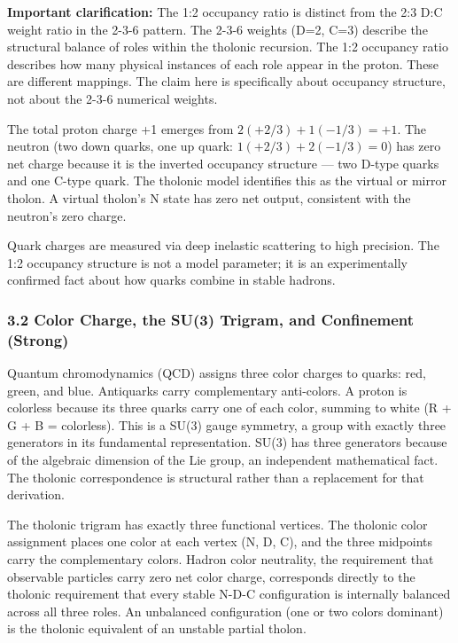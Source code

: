\documentclass[
  11pt,
  letterpaper,
]{article}
\begin{document}
\textbf{Important clarification:} The 1:2 occupancy ratio is distinct
from the 2:3 D:C weight ratio in the 2-3-6 pattern. The 2-3-6 weights
(D=2, C=3) describe the structural balance of roles within the tholonic
recursion. The 1:2 occupancy ratio describes how many physical instances
of each role appear in the proton. These are different mappings. The
claim here is specifically about occupancy structure, not about the
2-3-6 numerical weights.

The total proton charge +1 emerges from \(2(+2/3) + 1(-1/3) = +1\). The
neutron (two down quarks, one up quark: \(1(+2/3) + 2(-1/3) = 0\)) has
zero net charge because it is the inverted occupancy structure --- two
D-type quarks and one C-type quark. The tholonic model identifies this
as the virtual or mirror tholon. A virtual tholon's N state has zero net
output, consistent with the neutron's zero charge.

Quark charges are measured via deep inelastic scattering to high
precision. The 1:2 occupancy structure is not a model parameter; it is
an experimentally confirmed fact about how quarks combine in stable
hadrons.

\subsubsection{3.2 Color Charge, the SU(3) Trigram, and Confinement
(Strong)}\label{color-charge-the-su3-trigram-and-confinement-strong}

Quantum chromodynamics (QCD) assigns three color charges to quarks: red,
green, and blue. Antiquarks carry complementary anti-colors. A proton is
colorless because its three quarks carry one of each color, summing to
white (R + G + B = colorless). This is a SU(3) gauge symmetry, a group
with exactly three generators in its fundamental representation. SU(3)
has three generators because of the algebraic dimension of the Lie
group, an independent mathematical fact. The tholonic correspondence is
structural rather than a replacement for that derivation.

The tholonic trigram has exactly three functional vertices. The tholonic
color assignment places one color at each vertex (N, D, C), and the
three midpoints carry the complementary colors. Hadron color neutrality,
the requirement that observable particles carry zero net color charge,
corresponds directly to the tholonic requirement that every stable N-D-C
configuration is internally balanced across all three roles. An
unbalanced configuration (one or two colors dominant) is the tholonic
equivalent of an unstable partial tholon.
\end{document}
